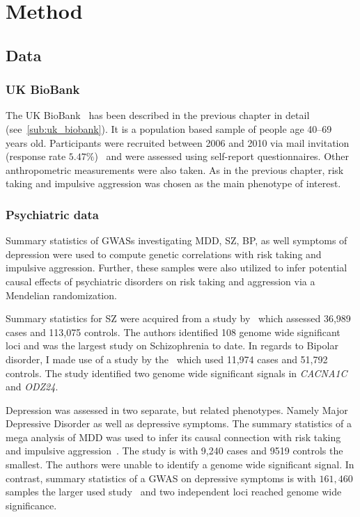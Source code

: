 \section{Method}
\label{sec:method}

\subsection{Data}
\label{sub:data}

\subsubsection{UK BioBank}
\label{ssub:uk_biobank_psych}

The UK BioBank~\cite{Allen2014} has been described in the previous chapter in detail (see~\ref{sub:uk_biobank}).
It is a population based sample of people age 40--69 years old. 
Participants were recruited between 2006 and 2010 via mail invitation (response rate $5.47\%$)~\cite{Sudlow2015} and were assessed using self-report questionnaires. Other anthropometric measurements were also taken.
As in the previous chapter, risk taking and impulsive aggression was chosen as the main phenotype of interest.

\subsubsection{Psychiatric data}
\label{ssub:psychiatric_data}

Summary statistics of GWASs investigating MDD, SZ, BP, as well symptoms of depression were used to compute genetic correlations with risk taking and impulsive aggression.
Further, these samples were also utilized to infer potential causal effects of psychiatric disorders on risk taking and aggression via a Mendelian randomization.

Summary statistics for SZ were acquired from a study by~\citet{Ripke2014} which assessed 36,989 cases and 113,075 controls.
The authors identified 108 genome wide significant loci and was the largest study on Schizophrenia to date.
In regards to Bipolar disorder, I made use of a study by the~\citet{PsychiatricGWASConsortiumBipolarDisorderWorkingGroup2011} which used 11,974 cases and 51,792 controls.
The study identified two genome wide significant signals in \textit{CACNA1C} and \textit{ODZ24}.

Depression was assessed in two separate, but related phenotypes. 
Namely Major Depressive Disorder as well as depressive symptoms.
The summary statistics of a mega analysis of MDD was used to infer its causal connection with risk taking and impulsive aggression~\cite{MajorDepressiveDisorderWorkingGroupofthePsychiatricGWASConsortium2013}.
The study is with 9,240 cases and 9519 controls the smallest. 
The authors were unable to identify a genome wide significant signal.
In contrast, summary statistics of a GWAS on depressive symptoms is with $161,460$ samples the larger used study~\cite{Okbay2016} and two independent loci reached genome wide significance.  

